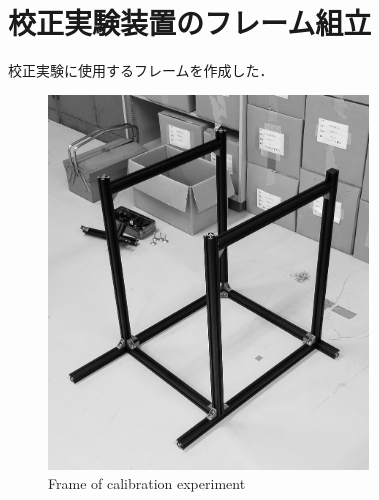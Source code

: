 \documentclass[twocolumn,a4j]{jsarticle}
\begin{document}
\section{校正実験装置のフレーム組立}
校正実験に使用するフレームを作成した．
\begin{figure}[htbp]
    \footnotesize
    \begin{center}
        \includegraphics[width=85mm]{../images/frame_1-2.jpg}
        \caption{Frame of calibration experiment}
    \end{center}
\end{figure}
\end{document}
